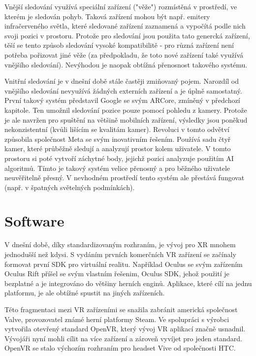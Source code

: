 Vnější sledování využívá speciální zařízení ("věže") rozmístěná v prostředí, ve kterém je sledován pohyb. Taková zařízení mohou být např. emitery infračerveného světla, které sledované zařízení zaznamená a vypočítá podle nich svoji pozici v prostoru. Protože pro sledování jsou použita tato genercká zařízení, těší se tento způsob sledování vysoké kompatibilitě - pro různá zařízení není potřeba pořizovat jiné věže (za předpokladu, že toto nové zařízení také využívá vnějšího sledování). Nevýhodou je naopak obtížná přenosnost takového systému. \cite{vr_tracking_suvi}

Vnitřní sledování je v dnešní době stále častěji zmiňovaný pojem. Narozdíl od vnějšího sledování nevyužívá žádných externích zařízení a je úplně samostatný. První takový systém představil Google se svým ARCore, zmíněný v předchozí kapitole. Ten umožnil sledování pozice pouze pomocí pohledu z kamery.  Protože je ale navržen pro spuštění na většině mobilních zařízení, výsledky jsou poněkud nekonzistentní (kvůli lišícím se kvalitám kamer).
Revoluci v tomto odvětví způsobila společnost Meta se svým inovativním řešením. Používá sadu čtyř kamer, které průběžně sledují a analyzují prostor kolem uživatele. V tomto prostoru si poté vytvoří záchytné body, jejichž pozici analyzuje použitím AI algoritmů. Tímto je takový systém velice přenosný a pro běžného uživatele neuvěřitelně přesný. V nevhodném prostředí tento systém ale přestává fungovat (např. v špatných světelných podmínkách). \cite{vr_tracking_suvi} \cite{enwiki:1182789097}

\chapter{Software}

V dnešní době, díky standardizovaným rozhraním, je vývoj pro XR mnohem jednodušší než kdysi. S vydáním prvních komerčních VR zařízení se začínaly formovat první \gls{SDK} pro virtuální realitu. Například Oculus se svým zařízením Oculus Rift příšel se svým vlastním řešenim, Oculus SDK, jehož použití je bezplatné a je integrováno do většiny herních enginů. Aplikace, které cílí na jednu platformu, je ale obtížné spustit na jiných zařízeních. \cite{enwiki:1193283032}

Této fragmentaci mezi VR zařízeními se snažila zabránit americká společnost Valve, provozovatel známé herní platformy Steam. Ve spolupráci s výrobci vytvořila otevřený standard OpenVR, který vývoj VR aplikací značně usnadnil. Vývojáři nyní mohli cílit na více zařízení a zároveň vyvíjet pro jeden standard. OpenVR se stalo výchozím rozhraním pro headset Vive od společnosti HTC. \cite{enwiki:1192992480}

